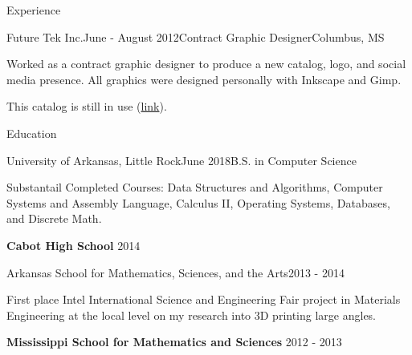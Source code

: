 \documentclass{resume} %
\begin{document}
\begin{rSection}{Experience}
\begin{rSubsection}{Future Tek Inc.}{June - August 2012}{Contract Graphic Designer}{Columbus, MS}

	\item Worked as a contract graphic designer to produce a new catalog, logo, and social media presence. All graphics were designed personally with Inkscape and Gimp.
	\item This catalog is still in use (\href{http://www.futuretekinc.com/wp-content/uploads/2014/08/Future-Tek-Catalog.pdf}{link}).
\end{rSubsection}

\end{rSection}

\clearpage


\begin{rSection}{Education}

\begin{rSubsection}{University of Arkansas, Little Rock}{June 2018}{B.S. in Computer Science}

	\item Substantail Completed Courses: Data Structures and Algorithms, Computer Systems and Assembly Language, Calculus II, Operating Systems, Databases, and Discrete Math.
\end{rSubsection}

{\bf Cabot High School} \hfill {2014} \hspace{0.0em}

\begin{rSubsection}{Arkansas School for Mathematics, Sciences, and the Arts}{2013 - 2014}{}

	\item First place Intel International Science and Engineering Fair project in Materials Engineering at the local level on my research into 3D printing large angles.
\end{rSubsection}


{\bf Mississippi School for Mathematics and Sciences} \hfill {2012 - 2013} \hspace{0.0em}

\end{rSection}
\end{document}
